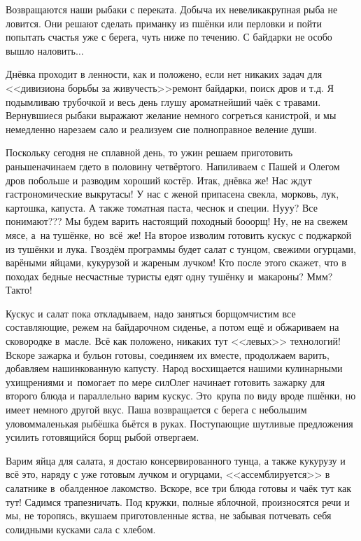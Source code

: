 Возвращаются наши рыбаки с переката. Добыча их невелика\mdash крупная рыба не ловится. Они решают сделать приманку из пшёнки или перловки и пойти попытать счастья уже с берега, чуть ниже по течению. С байдарки не особо вышло наловить$\ldots$

Днёвка проходит в ленности, как и положено, если нет никаких задач для <<дивизиона борьбы за живучесть>>\mdash ремонт байдарки, поиск дров и т.д. Я подымливаю трубочкой и весь день глушу ароматнейший чаёк с травами. Вернувшиеся рыбаки выражают желание немного согреться канистрой, и мы немедленно нарезаем сало и реализуем сие полноправное веление души.

Поскольку сегодня не сплавной день, то ужин решаем приготовить раньше\mdash начинаем где\sdash то в половину четвёртого. Напиливаем с Пашей и Олегом дров побольше и разводим хороший костёр. Итак, днёвка же! Нас ждут гастрономические выкрутасы! У нас с женой припасена свекла, морковь, лук, картошка, капуста. А также томатная паста, чеснок и специи. Ну\sdash у\sdash у? Все понимают??? Мы будем варить настоящий походный бо\sdash о\sdash орщ! Ну, не на свежем мясе, а~на тушёнке, но~всё~же! На второе изволим готовить кус\sdash кус с поджаркой из тушёнки и лука. Гвоздём программы будет салат с тунцом, свежими огурцами, варёными яйцами, кукурузой и жареным лучком! Кто после этого скажет, что в походах бедные несчастные туристы едят одну тушёнку и~макароны? М\sdash м\sdash м? Так\sdash то!

Кус\sdash кус и салат пока откладываем, надо заняться борщом\mdash чистим все составляющие, режем на байдарочном сиденье, а потом ещё и обжариваем на сковородке в~масле. Всё как положено, никаких тут <<левых>> технологий! Вскоре зажарка и бульон готовы, соединяем их вместе, продолжаем варить, добавляем нашинкованную капусту. Народ восхищается нашими кулинарными ухищрениями и~помогает по мере сил\mdash Олег начинает готовить зажарку для второго блюда и параллельно варим кус\sdash кус. Это~крупа по виду вроде пшёнки, но имеет немного другой вкус. Паша возвращается с берега с небольшим уловом\mdash маленькая рыбёшка бьётся в руках. Поступающие шутливые предложения усилить готовящийся борщ рыбой отвергаем. 

Варим яйца для салата, я достаю консервированного тунца, а также кукурузу и всё это, наряду с уже готовым лучком и огурцами, <<ассемблируется>> в салатнике в~обалденное лакомство. Вскоре, все три блюда готовы и чаёк тут как тут! Садимся трапезничать. Под кружки, полные яблочной, произносятся речи и мы, не торопясь, вкушаем приготовленные яства, не забывая потчевать себя солидными кусками сала с хлебом. 

